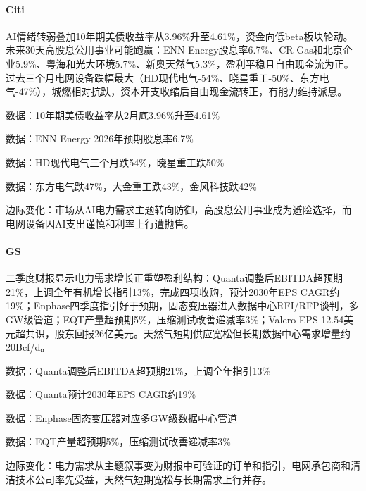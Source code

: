 \documentclass[11pt]{ctexart}
\begin{document}
\paragraph{Citi} AI情绪转弱叠加10年期美债收益率从3.96\%升至4.61\%，资金向低beta板块轮动。未来30天高股息公用事业可能跑赢：ENN Energy股息率6.7\%、CR Gas和北京企业5.9\%、粤海和光大环境5.7\%、新奥天然气5.3\%，盈利平稳且自由现金流为正。过去三个月电网设备跌幅最大（HD现代电气-54\%、晓星重工-50\%、东方电气-47\%），城燃相对抗跌，资本开支收缩后自由现金流转正，有能力维持派息。
{\small\color{refgray}数据：10年期美债收益率从2月底3.96\%升至4.61\%\par}
{\small\color{refgray}数据：ENN Energy 2026年预期股息率6.7\%\par}
{\small\color{refgray}数据：HD现代电气三个月跌54\%，晓星重工跌50\%\par}
{\small\color{refgray}数据：东方电气跌47\%，大金重工跌43\%，金风科技跌42\%\par}
{\small\color{refgray}边际变化：市场从AI电力需求主题转向防御，高股息公用事业成为避险选择，而电网设备因AI支出谨慎和利率上行遭抛售。\par}
\paragraph{GS} 二季度财报显示电力需求增长正重塑盈利结构：Quanta调整后EBITDA超预期21\%，上调全年有机增长指引13\%，完成四项收购，预计2030年EPS CAGR约19\%；Enphase四季度指引好于预期，固态变压器进入数据中心RFI/RFP谈判，多GW级管道；EQT产量超预期5\%，压缩测试改善递减率3\%；Valero EPS 12.54美元超共识，股东回报26亿美元。天然气短期供应宽松但长期数据中心需求增量约20Bcf/d。
{\small\color{refgray}数据：Quanta调整后EBITDA超预期21\%，上调全年指引13\%\par}
{\small\color{refgray}数据：Quanta预计2030年EPS CAGR约19\%\par}
{\small\color{refgray}数据：Enphase固态变压器对应多GW级数据中心管道\par}
{\small\color{refgray}数据：EQT产量超预期5\%，压缩测试改善递减率3\%\par}
{\small\color{refgray}边际变化：电力需求从主题叙事变为财报中可验证的订单和指引，电网承包商和清洁技术公司率先受益，天然气短期宽松与长期需求上行并存。\par}
\end{document}
